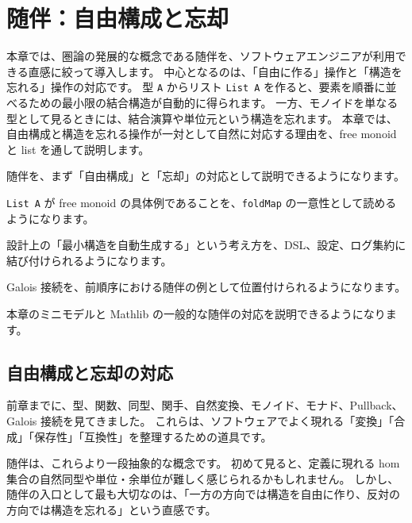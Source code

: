 \chapter{随伴：自由構成と忘却}
\label{chap:ch37_adjunction}

\begin{chapterabstract}
本章では、圏論の発展的な概念である随伴を、ソフトウェアエンジニアが利用できる直感に絞って導入します。
中心となるのは、「自由に作る」操作と「構造を忘れる」操作の対応です。
型 \texttt{A} からリスト \texttt{List A} を作ると、要素を順番に並べるための最小限の結合構造が自動的に得られます。
一方、モノイドを単なる型として見るときには、結合演算や単位元という構造を忘れます。
本章では、自由構成と構造を忘れる操作が一対として自然に対応する理由を、free monoid と list を通して説明します。
\end{chapterabstract}

\begin{learninggoals}
\item 随伴を、まず「自由構成」と「忘却」の対応として説明できるようになります。
\item \texttt{List A} が free monoid の具体例であることを、\texttt{foldMap} の一意性として読めるようになります。
\item 設計上の「最小構造を自動生成する」という考え方を、DSL、設定、ログ集約に結び付けられるようになります。
\item Galois 接続を、前順序における随伴の例として位置付けられるようになります。
\item 本章のミニモデルと Mathlib の一般的な随伴の対応を説明できるようになります。
\end{learninggoals}

\section{自由構成と忘却の対応}
\label{sec:ch37-why}

前章までに、型、関数、同型、関手、自然変換、モノイド、モナド、Pullback、Galois 接続を見てきました。
これらは、ソフトウェアでよく現れる「変換」「合成」「保存性」「互換性」を整理するための道具です。

随伴は、これらより一段抽象的な概念です。
初めて見ると、定義に現れる hom 集合の自然同型や単位・余単位が難しく感じられるかもしれません。
しかし、随伴の入口として最も大切なのは、「一方の方向では構造を自由に作り、反対の方向では構造を忘れる」という直感です。

